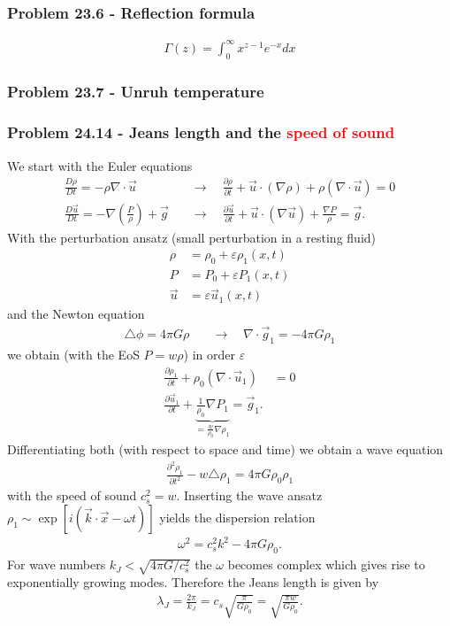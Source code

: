 \documentclass[10pt,a4paper]{article}
\theoremstyle{definition}
\begin{document}
\subsubsection{Problem 23.6 - Reflection formula}
\begin{align}
    \Gamma(z)=\int_0^\infty x^{z-1}e^{-x}dx
\end{align}



\subsubsection{Problem 23.7 - Unruh temperature}

\subsubsection{Problem 24.14 - Jeans length and the \textcolor{red}{speed of sound}}
We start with the Euler equations
\begin{align}
    \frac{D\rho}{Dt}=-\rho\nabla\cdot\vec{u}\quad&\rightarrow\quad\frac{\partial\rho}{\partial t}+\vec{u}\cdot(\nabla\rho)+\rho(\nabla\cdot\vec{u})=0\\
    \frac{D\vec{u}}{Dt}=-\nabla\left(\frac{P}{\rho}\right)+\vec{g}\quad&\rightarrow\quad\frac{\partial\vec{u}}{\partial t}+\vec{u}\cdot(\nabla\vec{u})+\frac{\nabla P}{\rho}=\vec{g}.
\end{align}
With the perturbation ansatz (small perturbation in a resting fluid)
\begin{align}
    \rho&=\rho_0+\varepsilon \rho_1(x,t)\\
    P&=P_0+\varepsilon P_1(x,t)\\
    \vec{u}&=\varepsilon \vec{u}_1(x,t)
\end{align}
and the Newton equation
\begin{align}
    \triangle\phi=4\pi G\rho\quad&\rightarrow\quad\nabla\cdot\vec{g}_1=-4\pi G\rho_1
\end{align}
we obtain (with the EoS $P=w\rho$) in order $\varepsilon$
\begin{align}
    \frac{\partial\rho_1}{\partial t}+\rho_0(\nabla\cdot\vec{u}_1)&=0\\
    \frac{\partial\vec{u}_1}{\partial t}+\underbrace{\frac{1}{\rho_0}\nabla P_1}_{=\frac{w}{\rho_0}\nabla\rho_1}=\vec{g}_1.
\end{align}
Differentiating both (with respect to space and time) we obtain a wave equation
\begin{align}
    \frac{\partial^2\rho_1}{\partial t^2}-w\triangle\rho_1=4\pi G\rho_0\rho_1
\end{align}
with the speed of sound $c_s^2=w$. Inserting the wave ansatz $\rho_1\sim\exp[i(\vec{k}\cdot\vec{x}-\omega t)]$ yields the dispersion relation
\begin{align}
    \omega^2=c_s^2k^2-4\pi G\rho_0.
\end{align}
For wave numbers $k_J<\sqrt{4\pi G/c_s^2}$ the $\omega$ becomes complex which gives rise to exponentially growing modes. Therefore the Jeans length is given by
\begin{align}
    \lambda_J=\frac{2\pi}{k_J}=c_s\sqrt{\frac{\pi}{G\rho_0}}=\sqrt{\frac{\pi w}{G\rho_0}}.
\end{align}
\end{document}
